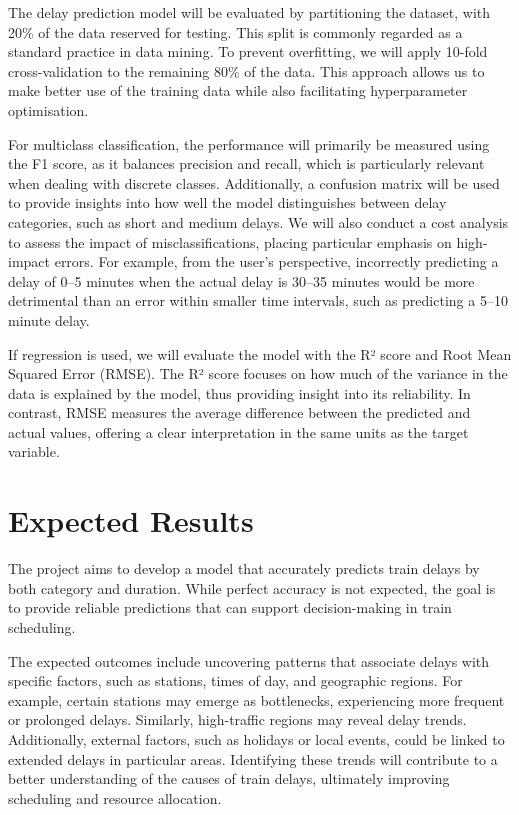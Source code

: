 \documentclass[a4paper,oneside,bibliography=totoc]{scrbook}
\begin{document}
The delay prediction model will be evaluated by partitioning the dataset, with 20\% of the data reserved for testing.
This split is commonly regarded as a standard practice in data mining.
To prevent overfitting, we will apply 10-fold cross-validation to the remaining 80\% of the data.
This approach allows us to make better use of the training data while also facilitating hyperparameter optimisation.

For multiclass classification, the performance will primarily be measured using the F1 score,
as it balances precision and recall, which is particularly relevant when dealing with discrete classes.
Additionally, a confusion matrix will be used to provide insights into how well the model distinguishes between delay categories, such as short and medium delays.
We will also conduct a cost analysis to assess the impact of misclassifications, placing particular emphasis on high-impact errors.
For example, from the user's perspective,
incorrectly predicting a delay of 0–5 minutes when the actual delay is 30–35 minutes would be more detrimental than an error within smaller time intervals,
such as predicting a 5–10 minute delay.

If regression is used, we will evaluate the model with the R² score and Root Mean Squared Error (RMSE).
The R² score focuses on how much of the variance in the data is explained by the model, thus providing insight into its reliability.
In contrast, RMSE measures the average difference between the predicted and actual values,
offering a clear interpretation in the same units as the target variable.

\chapter{Expected Results}
\label{ch:expected_results}

The project aims to develop a model that accurately predicts train delays by both category and duration.
While perfect accuracy is not expected, the goal is to provide reliable predictions that can support decision-making in train scheduling.

The expected outcomes include uncovering patterns that associate delays with specific factors,
such as stations, times of day, and geographic regions.
For example, certain stations may emerge as bottlenecks, experiencing more frequent or prolonged delays.
Similarly, high-traffic regions may reveal delay trends.
Additionally, external factors, such as holidays or local events, could be linked to extended delays in particular areas.
Identifying these trends will contribute to a better understanding of the causes of train delays, ultimately improving scheduling and resource allocation.
\end{document}
